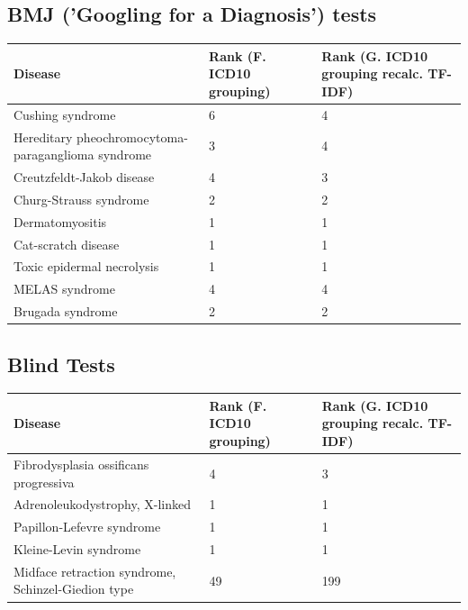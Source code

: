 \documentclass[10pt,letterpaper,two column,final]{article}
\begin{document}
\subsection{BMJ ('Googling for a Diagnosis') tests }
\label{app:bmj_icd10_icd10recalc}
\begin{center}
\begin{small}
	\begin{tabular}{|p{6cm}|p{2.5cm}|p{2.5cm}|}
	\hline
	\textbf{Disease}  & \textbf{Rank (F. ICD10 grouping)} & \textbf{Rank (G. ICD10 grouping recalc. TF-IDF)} \\
	\hline\hline
Cushing syndrome & 6 & 4\\    \hline
Hereditary pheochromocytoma-paraganglioma syndrome & 3 & 4\\    \hline
Creutzfeldt-Jakob disease & 4 & 3\\    \hline
Churg-Strauss syndrome & 2 & 2\\    \hline
Dermatomyositis & 1 & 1\\    \hline
Cat-scratch disease & 1 & 1\\    \hline
Toxic epidermal necrolysis & 1 & 1\\    \hline
MELAS syndrome & 4 & 4\\    \hline
Brugada syndrome & 2 & 2\\    \hline
	\end{tabular}
\end{small}
\end{center}

\subsection{Blind Tests}
\label{app:blind_icd10_icd10recalc}
\begin{center}
\begin{small}
	\begin{tabular}{|p{6cm}|p{2.5cm}|p{2.5cm}|}
	\hline
	\textbf{Disease}  & \textbf{Rank (F. ICD10 grouping)} & \textbf{Rank (G. ICD10 grouping recalc. TF-IDF)} \\
	\hline\hline
Fibrodysplasia ossificans progressiva & 4 & 3\\    \hline
Adrenoleukodystrophy, X-linked & 1 & 1\\    \hline
Papillon-Lefevre syndrome & 1 & 1\\    \hline
Kleine-Levin syndrome & 1 & 1\\    \hline
Midface retraction syndrome, Schinzel-Giedion type & 49 & 199\\    \hline
	\end{tabular}
\end{small}
\end{center}
\end{document}
